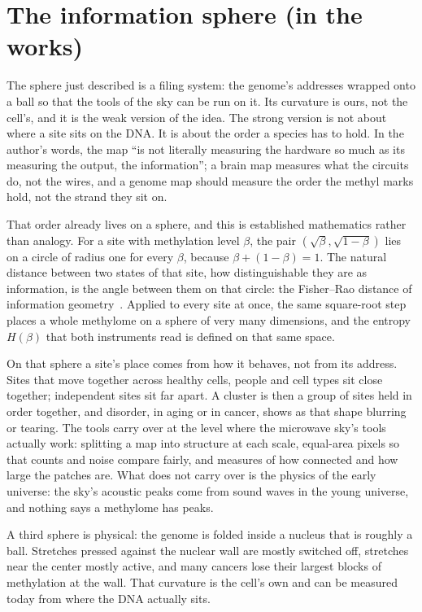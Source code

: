 \section{The information sphere (in the works)}\label{sec:ag_infosphere}

The sphere just described is a filing system: the genome's addresses wrapped onto a ball so that the tools of the sky can be run on it.
Its curvature is ours, not the cell's, and it is the weak version of the idea. The strong version is not about where a site sits on the
DNA. It is about the order a species has to hold. In the author's words, the map ``is not literally measuring the hardware so much as
its measuring the output, the information''; a brain map measures what the circuits do, not the wires, and a genome map should measure
the order the methyl marks hold, not the strand they sit on.

That order already lives on a sphere, and this is established mathematics rather than analogy. For a site with methylation level
$\beta$, the pair $(\sqrt{\beta},\sqrt{1-\beta})$ lies on a circle of radius one for every $\beta$, because $\beta+(1-\beta)=1$. The
natural distance between two states of that site, how distinguishable they are as information, is the angle between them on that
circle: the Fisher--Rao distance of information geometry~\cite{Amari2016}. Applied to every site at once, the same square-root step places a whole
methylome on a sphere of very many dimensions, and the entropy $H(\beta)$ that both instruments read is defined on that same space.
\derived

On that sphere a site's place comes from how it behaves, not from its address. Sites that move together across healthy cells, people
and cell types sit close together; independent sites sit far apart. A cluster is then a group of sites held in order together, and
disorder, in aging or in cancer, shows as that shape blurring or tearing. The tools carry over at the level where the microwave sky's
tools actually work: splitting a map into structure at each scale, equal-area pixels so that counts and noise compare fairly, and
measures of how connected and how large the patches are. What does not carry over is the physics of the early universe: the sky's
acoustic peaks come from sound waves in the young universe, and nothing says a methylome has peaks. \interp

A third sphere is physical: the genome is folded inside a nucleus that is roughly a ball. Stretches pressed against the nuclear wall are
mostly switched off, stretches near the center mostly active, and many cancers lose their largest blocks of methylation at the wall.
That curvature is the cell's own and can be measured today from where the DNA actually sits.

